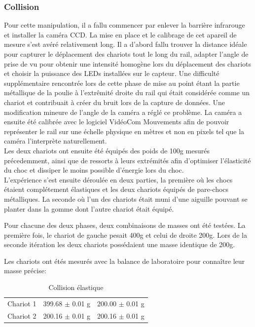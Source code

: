 \subsubsection{Collision}
Pour cette manipulation, il a fallu commencer par enlever la barrière infrarouge et installer la caméra CCD.
La mise en place et le calibrage de cet apareil de mesure s'est avéré relativement long. Il a d'abord fallu trouver la distance idéale pour capturer le déplacement des chariots tout le long du rail, adapter l'angle de prise de vu pour obtenir une intensité homogène lors du déplacement des chariots et choisir la puissance des LEDs installées sur le capteur. Une difficulté supplémentaire rencontrée lors de cette phase de mise au point étant la partie métallique de la poulie à l'extrêmité droite du rail qui était considérée comme un chariot et contribuait à créer du bruit lors de la capture de données. Une modification mineure de l'angle de la caméra a réglé ce problème.
La caméra a ensuite été calibrée avec le logiciel VidéoCom Mouvements afin de pouvoir représenter le rail sur une échelle physique en mètres et non en pixels tel que la caméra l'interprète naturellement.\\
Les deux chariots ont ensuite été équipés des poids de 100g mesurés précedemment, ainsi que de ressorts à leurs extrémités afin d'optimiser l'élasticité du choc et dissiper le moins possible d'énergie lors du choc. \\

L'expérience s'est ensuite déroulée en deux parties, la première où les chocs étaient complétement élastiques et les deux chariots équipés de pare-chocs métalliques. La seconde où l'un des chariots était muni d'une aiguille pouvant se planter dans la gomme dont l'autre chariot était équipé.

Pour chacune des deux phases, deux combinaisons de masses ont été testées. La première fois, le chariot de gauche pesait 400g et celui de droite 200g. Lors de la seconde itération les deux chariots possédaient une masse identique de 200g.

Les chariots ont étés mesurés avec la balance de laboratoire pour connaître leur masse précise:
\begin{table}[h]
    \centering
    \caption{Collision élastique}
    \begin{tabular}{|l|l|l|}
	\hline
	Chariot 1 & 399.68 $\pm$ 0.01 g & 200.00 $\pm$ 0.01 g \\
	Chariot 2 & 200.16 $\pm$ 0.01 g & 200.16 $\pm$ 0.01 g \\
	\hline
    \end{tabular}
\end{table}

